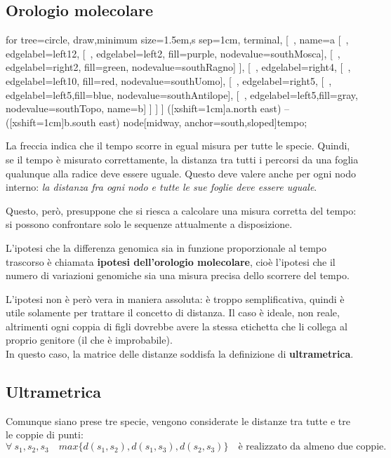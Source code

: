 \subsection{Orologio molecolare}
\begin{example}{}{}

	\begin{center}
	\begin{forest}
		for tree={circle, draw,minimum size=1.5em,s sep=1cm, terminal},
		[~, name=a
			[~, edgelabel={left}{12},
				[~, edgelabel={left}{2}, fill=purple, nodevalue={south}{Mosca}],
				[~, edgelabel={right}{2}, fill=green, nodevalue={south}{Ragno}]
			],
			[~, edgelabel={right}{4},
				[~, edgelabel={left}{10}, fill=red, nodevalue={south}{Uomo}],
				[~, edgelabel={right}{5},
					[~, edgelabel={left}{5},fill=blue, nodevalue={south}{Antilope}],
					[~, edgelabel={left}{5},fill=gray, nodevalue={south}{Topo}, name=b]
				]
			]
		]
		 ([xshift=1cm]a.north east) -- ([xshift=1cm]b.south east) node[midway, anchor=south,sloped]{tempo};
	\end{forest}
	\end{center}

	La freccia indica che il tempo scorre in egual misura per tutte le specie. Quindi, se il tempo è misurato correttamente, la distanza tra tutti i percorsi da una foglia qualunque alla radice deve essere uguale. Questo deve valere anche per ogni nodo interno: \textit{la distanza fra ogni nodo e tutte le sue foglie deve essere uguale}.
\end{example}

Questo, però, presuppone che si riesca a calcolare una misura corretta del tempo: si possono confrontare solo le sequenze attualmente a disposizione.

L'ipotesi che la differenza genomica sia in funzione proporzionale al tempo trascorso è chiamata \textbf{ipotesi dell'orologio molecolare}, cioè l'ipotesi che il numero di variazioni genomiche sia una misura precisa dello scorrere del tempo.

L'ipotesi non è però vera in maniera assoluta: è troppo semplificativa, quindi è utile solamente per trattare il concetto di distanza. Il caso è ideale, non reale, altrimenti ogni coppia di figli dovrebbe avere la stessa etichetta che li collega al proprio genitore (il che è improbabile). \\
In questo caso, la matrice delle distanze soddisfa la definizione di \textbf{ultrametrica}.

\subsection{Ultrametrica}
Comunque siano prese tre specie, vengono considerate le distanze tra tutte e tre le coppie di punti:
$$\forall\ s_1, s_2, s_3 \quad max\{d(s_1, s_2), d(s_1, s_3), d(s_2, s_3)\}\quad\text{è realizzato da almeno due coppie.}$$

